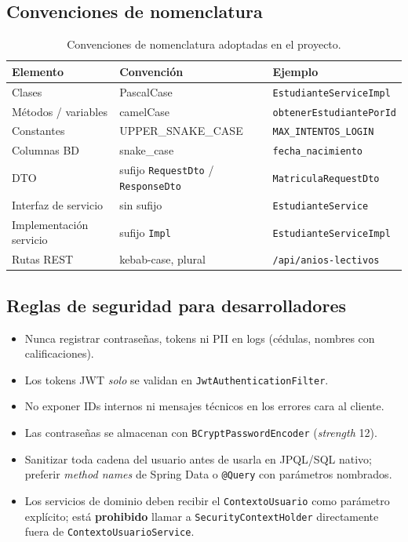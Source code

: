 \documentclass[11pt,a4paper,oneside]{article}
\newcommand{\code}[1]{\texttt{\small #1}}
\begin{document}
\subsection{Convenciones de nomenclatura}

\begin{table}[h]\centering\small\renewcommand{\arraystretch}{1.2}
\begin{tabular}{@{}p{4.6cm} p{4.0cm} p{4.5cm}@{}}
\toprule
\textbf{Elemento} & \textbf{Convención} & \textbf{Ejemplo} \\
\midrule
Clases                  & PascalCase           & \code{EstudianteServiceImpl} \\
Métodos / variables     & camelCase            & \code{obtenerEstudiantePorId} \\
Constantes              & UPPER\_SNAKE\_CASE   & \code{MAX\_INTENTOS\_LOGIN} \\
Columnas BD             & snake\_case          & \code{fecha\_nacimiento} \\
DTO                     & sufijo \code{RequestDto} / \code{ResponseDto} & \code{MatriculaRequestDto} \\
Interfaz de servicio    & sin sufijo           & \code{EstudianteService} \\
Implementación servicio & sufijo \code{Impl}   & \code{EstudianteServiceImpl} \\
Rutas REST              & kebab-case, plural   & \code{/api/anios-lectivos} \\
\bottomrule
\end{tabular}
\caption{Convenciones de nomenclatura adoptadas en el proyecto.}
\end{table}

\subsection{Reglas de seguridad para desarrolladores}

\begin{ataraAlerta}
\begin{itemize}[leftmargin=*]
  \item Nunca registrar contraseñas, tokens ni PII en logs (cédulas, nombres con calificaciones).
  \item Los tokens JWT \emph{solo} se validan en \code{JwtAuthenticationFilter}.
  \item No exponer IDs internos ni mensajes técnicos en los errores cara al cliente.
  \item Las contraseñas se almacenan con \code{BCryptPasswordEncoder} (\emph{strength} 12).
  \item Sanitizar toda cadena del usuario antes de usarla en JPQL/SQL nativo; preferir
        \emph{method names} de Spring Data o \code{@Query} con parámetros nombrados.
  \item Los servicios de dominio deben recibir el \code{ContextoUsuario} como parámetro
        explícito; está \textbf{prohibido} llamar a \code{SecurityContextHolder} directamente
        fuera de \code{ContextoUsuarioService}.
\end{itemize}
\end{ataraAlerta}
\end{document}

